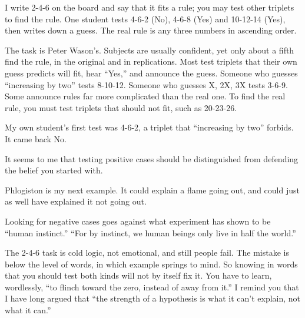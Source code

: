 
I write 2-4-6 on the board and say that it fits a rule; you may test other triplets to find the rule. One student tests 4-6-2 (No), 4-6-8 (Yes) and 10-12-14 (Yes), then writes down a guess. The real rule is any three numbers in ascending order.

The task is Peter Wason's. Subjects are usually confident, yet only about a fifth find the rule, in the original and in replications. Most test triplets that their own guess predicts will fit, hear ``Yes,'' and announce the guess. Someone who guesses ``increasing by two'' tests 8-10-12. Someone who guesses X, 2X, 3X tests 3-6-9. Some announce rules far more complicated than the real one. To find the real rule, you must test triplets that should not fit, such as 20-23-26.

My own student's first test was 4-6-2, a triplet that ``increasing by two'' forbids. It came back No. 


It seems to me that testing positive cases should be distinguished from defending the belief you started with. 

Phlogiston is my next example. It could explain a flame going out, and could just as well have explained it not going out.

Looking for negative cases goes against what experiment has shown to be ``human instinct.'' ``For by instinct, we human beings only live in half the world.''

The 2-4-6 task is cold logic, not emotional, and still people fail. The mistake is below the level of words, in which example springs to mind. So knowing in words that you should test both kinds will not by itself fix it. You have to learn, wordlessly, ``to flinch toward the zero, instead of away from it.''  I remind you that I have long argued that ``the strength of a hypothesis is what it can't explain, not what it can.''

